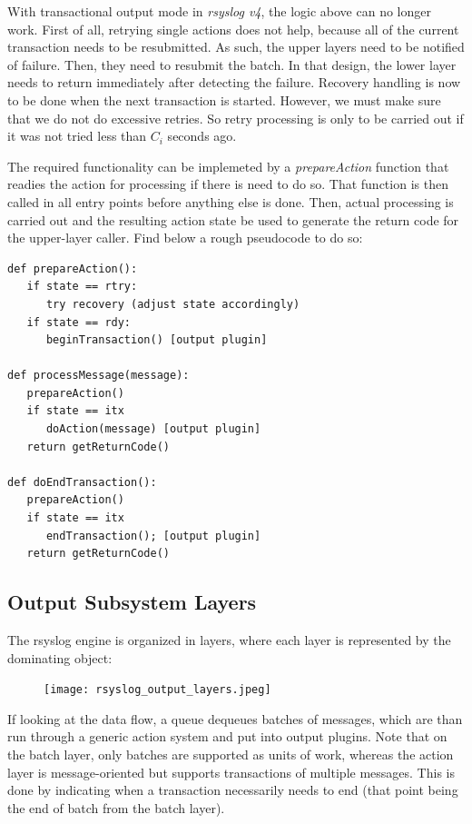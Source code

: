 \documentclass[a4paper,10pt]{article}
\begin{document}
With transactional output mode in \emph{rsyslog v4}, the logic above can no longer work. First of all, retrying single actions does not help, because all of the current transaction needs to be resubmitted. As such, the upper layers need to be notified of failure. Then, they need to resubmit the batch. In that design, the lower layer needs to return immediately after detecting the failure. Recovery handling is now to be done when the next transaction is started. However, we must make sure that we do not do excessive retries. So retry processing is only to be carried out if it was not tried less than $C_i$ seconds ago.

The required functionality can be implemeted by a \emph{prepareAction} function that readies the action for processing if there is need to do so. That function is then called in all entry points before anything else is done. Then, actual processing is carried out and the resulting action state be used to generate the return code for the upper-layer caller. Find below a rough pseudocode to do so:

\lstset{language=python}
\begin{lstlisting}
def prepareAction():
   if state == rtry:
      try recovery (adjust state accordingly)
   if state == rdy:
      beginTransaction() [output plugin]
    
def processMessage(message):
   prepareAction()
   if state == itx
      doAction(message) [output plugin]
   return getReturnCode()

def doEndTransaction():
   prepareAction()
   if state == itx
      endTransaction(); [output plugin]
   return getReturnCode()
\end{lstlisting}

\subsection{Output Subsystem Layers}
The rsyslog engine is organized in layers, where each layer is represented by the dominating object:

\begin{figure}
\texttt{[image: rsyslog\_output\_layers.jpeg]}
\label{rsyslog output layers}
\end{figure}

If looking at the data flow, a queue dequeues batches of messages, which are than run through a generic action system and put into output plugins. Note that on the batch layer, only batches are supported as units of work, whereas the action layer is message-oriented but supports transactions of multiple messages. This is done by indicating when a transaction necessarily needs to end (that point being the end of batch from the batch layer).
\end{document}
